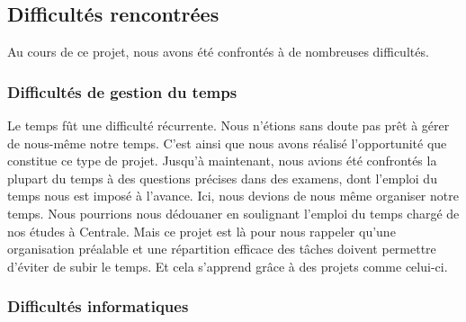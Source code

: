 %
%


\subsection{Difficultés rencontrées}

Au cours de ce projet, nous avons été confrontés à de nombreuses difficultés.

\subsubsection{Difficultés de gestion du temps}



Le temps fût une difficulté récurrente. Nous n'étions sans doute pas prêt à gérer de nous-même notre temps. C'est ainsi que nous avons réalisé l'opportunité que constitue ce type de projet. 
Jusqu'à maintenant, nous avions été confrontés la plupart du temps à des questions précises dans des examens, dont l'emploi du temps nous est imposé à l'avance. 
Ici, nous devions de nous même organiser notre temps. 
Nous pourrions nous dédouaner en soulignant l'emploi du temps chargé de nos études à Centrale. 
Mais ce projet est là pour nous rappeler qu'une organisation préalable et une répartition efficace des tâches doivent permettre d'éviter de subir le temps. Et cela s'apprend grâce à des projets comme celui-ci.

\subsubsection{Difficultés informatiques}

